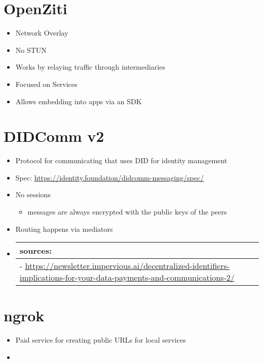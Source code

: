 \hypertarget{openziti}{%
\section{OpenZiti}\label{openziti}}

\begin{itemize}
\tightlist
\item
  Network Overlay
\item
  No STUN
\item
  Works by relaying traffic through intermediaries
\item
  Focused on Services
\item
  Allows embedding into apps via an SDK
\end{itemize}

\hypertarget{didcomm-v2}{%
\section{DIDComm v2}\label{didcomm-v2}}

\begin{itemize}
\item
  Protocol for communicating that uses DID for identity management
\item
  Spec: \url{https://identity.foundation/didcomm-messaging/spec/}
\item
  No sessions

  \begin{itemize}
  \tightlist
  \item
    messages are always encrypted with the public keys of the peers
  \end{itemize}
\item
  Routing happens via mediators
\item
  \begin{longtable}[]{@{}l@{}}
  \toprule()
  sources: \\
  \midrule()
  \endhead
  -
  \url{https://newsletter.impervious.ai/decentralized-identifiers-implications-for-your-data-payments-and-communications-2/} \\
  \bottomrule()
  \end{longtable}
\end{itemize}

\hypertarget{ngrok}{%
\section{ngrok}\label{ngrok}}

\begin{itemize}
\tightlist
\item
  Paid service for creating public URLs for local services
\item
\end{itemize}

